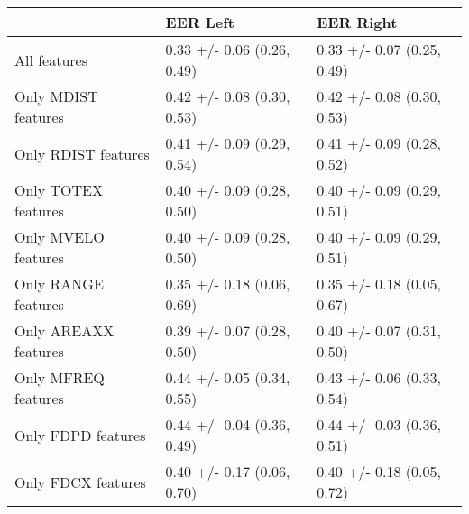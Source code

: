 \begin{tabular}{lll}
\toprule
{} &                    EER Left &                   EER Right \\
\midrule
All features         &  0.33 +/- 0.06 (0.26, 0.49) &  0.33 +/- 0.07 (0.25, 0.49) \\
Only MDIST features  &  0.42 +/- 0.08 (0.30, 0.53) &  0.42 +/- 0.08 (0.30, 0.53) \\
Only RDIST features  &  0.41 +/- 0.09 (0.29, 0.54) &  0.41 +/- 0.09 (0.28, 0.52) \\
Only TOTEX features  &  0.40 +/- 0.09 (0.28, 0.50) &  0.40 +/- 0.09 (0.29, 0.51) \\
Only MVELO features  &  0.40 +/- 0.09 (0.28, 0.50) &  0.40 +/- 0.09 (0.29, 0.51) \\
Only RANGE features  &  0.35 +/- 0.18 (0.06, 0.69) &  0.35 +/- 0.18 (0.05, 0.67) \\
Only AREAXX features &  0.39 +/- 0.07 (0.28, 0.50) &  0.40 +/- 0.07 (0.31, 0.50) \\
Only MFREQ features  &  0.44 +/- 0.05 (0.34, 0.55) &  0.43 +/- 0.06 (0.33, 0.54) \\
Only FDPD features   &  0.44 +/- 0.04 (0.36, 0.49) &  0.44 +/- 0.03 (0.36, 0.51) \\
Only FDCX features   &  0.40 +/- 0.17 (0.06, 0.70) &  0.40 +/- 0.18 (0.05, 0.72) \\
\bottomrule
\end{tabular}
